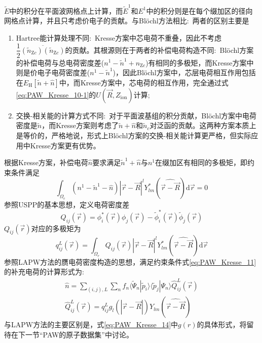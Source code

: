 $\tilde E$中的积分在平面波网格点上计算，而$\tilde E^1$和$E^1$中的积分则是在每个缀加区的径向网格点计算，并且只考虑价电子的贡献。与\textrm{Bl\"ochl}方法相比:~两者的区别主要是
\begin{enumerate}
	\item \textrm{Hartree}能计算处理不同:~\textrm{Kresse}方案中芯电荷不重叠，因此不考虑$\dfrac12\overline{(\tilde n_{\mathrm{Z}c})(\tilde n_{\mathrm{Z}c})}$的贡献。其根源则在于两者的补偿电荷构造不同:~\textrm{Bl\"ochl}方案的补偿电荷与总电荷密度差($n^1-\tilde n^1+n_{\mathrm{Z}c}$)有相同的多极矩，而\textrm{Kresse}方案中则是价电子电荷密度差($n^1-\tilde n^1$)，因此\textrm{Bl\"ochl}方案中，芯层电荷相互作用包括在$E_{\mathrm H}[\tilde n+\hat n]$中，而\textrm{Kresse}方案中，芯电荷的相互作用，完全通过式\eqref{eq:PAW_Kresse_10-1}的$U(\vec R,Z_{\mathrm{ion}})$计算;
	\item 交换-相关能的计算方式不同:~对于平面波基组的积分贡献，\textrm{Bl\"ochl}方案中电荷密度是$\tilde n$，而\textrm{Kresse}方案则考虑了$\tilde n+\hat n$和$\tilde n_c$对泛函的贡献。这两种方案本质上是等价的，严格地说，形式上\textrm{Bl\"ochl}方案的交换-相关能计算更严格，但实际应用中\textrm{Kresse}方案更有优势。
\end{enumerate}

根据\textrm{Kresse}方案，补偿电荷$\hat n$要求满足$\tilde n^1+\hat n$与$n^1$在缀加区有相同的多极矩，即约束条件满足 
\begin{equation}
	\int_{\Omega_c}(n^1-\tilde n^1-\hat n)|\vec r-\vec R|^lY_{lm}^{\ast}(\widehat{\vec r-\vec R})\mathrm{d}\vec r=0
	\label{eq:PAW_Kresse_11}
\end{equation}
参照\textrm{USPP}的基本思想，定义电荷密度差
\begin{equation}
	Q_{ij}(\vec r)=\phi_i^{\ast}(\vec r)\phi_j(\vec r)-\tilde\phi_i^{\ast}(\vec r)\tilde\phi_j(\vec r)
	\label{eq:PAW_Kresse_12}
\end{equation}
$Q_{ij}(\vec r)$对应的多极矩为
\begin{equation}
	q_{ij}^L(\vec r)=\int_{\Omega_r}Q_{ij}(\vec r)|\vec r-\vec R|^lY_{lm}^{\ast}(\widehat{\vec r-\vec R})\mathrm{d}\vec r
	\label{eq:PAW_Kresse_13}
\end{equation}
参照\textrm{LAPW}方法的赝电荷密度构造的思想，满足约束条件式\eqref{eq:PAW_Kresse_11}的补充电荷的计算形式为:~
\begin{equation}
	\begin{aligned}
		\hat n=\sum_{(i,j),L}\sum_n f_n\langle\tilde\Psi_n|\tilde p_i\rangle\langle\tilde p_j|\Psi_n\rangle\hat Q_{ij}^L(\vec r)\\
		\hat Q_{ij}^L(\vec r)=q_{ij}^Lg_l(|\vec r-\vec R|)Y_{lm}(\widehat{\vec r-\vec R})
	\end{aligned}
	\label{eq:PAW_Kresse_14}
\end{equation}
与\textrm{LAPW}方法的主要区别是，式\eqref{eq:PAW_Kresse_14}中$g(r)$的具体形式，将留待在下一节“\textrm{PAW}的原子数据集”中讨论。

